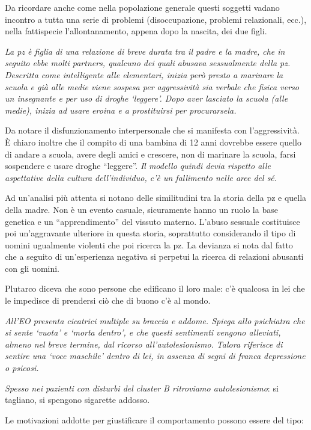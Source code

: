 \documentclass[]{article}
\begin{document}
Da ricordare anche come nella popolazione generale questi soggetti
vadano incontro a tutta una serie di problemi (disoccupazione, problemi
relazionali, ecc.), nella fattispecie l'allontanamento, appena dopo la
nascita, dei due figli.

\emph{La pz è figlia di una relazione di breve durata tra il padre e la
madre, che in seguito ebbe molti partners, qualcuno dei quali abusava
sessualmente della pz. Descritta come intelligente alle elementari,
inizia però presto a marinare la scuola e già alle medie viene sospesa
per aggressività sia verbale che fisica verso un insegnante e per uso di
droghe `leggere'. Dopo aver lasciato la scuola (alle medie), inizia ad
usare eroina e a prostituirsi per procurarsela. }

Da notare il disfunzionamento interpersonale che si manifesta con
l'aggressività. È chiaro inoltre che il compito di una bambina di 12
anni dovrebbe essere quello di andare a scuola, avere degli amici e
crescere, non di marinare la scuola, farsi sospendere e usare droghe
``leggere''. \emph{Il modello quindi devia rispetto alle aspettative
della cultura dell'individuo, c'è un fallimento nelle aree del sé.}

Ad un'analisi più attenta si notano delle similitudini tra la storia
della pz e quella della madre. Non è un evento casuale, sicuramente
hanno un ruolo la base genetica e un ``apprendimento'' del vissuto
materno. L'abuso sessuale costituisce poi un'aggravante ulteriore in
questa storia, soprattutto considerando il tipo di uomini ugualmente
violenti che poi ricerca la pz. La devianza si nota dal fatto che a
seguito di un'esperienza negativa si perpetui la ricerca di relazioni
abusanti con gli uomini.

Plutarco diceva che sono persone che edificano il loro male: c'è
qualcosa in lei che le impedisce di prendersi ciò che di buono c'è al
mondo.

\emph{All'EO presenta cicatrici multiple su braccia e addome. Spiega
allo psichiatra che si sente `vuota' e `morta dentro', e che questi
sentimenti vengono alleviati, almeno nel breve termine, dal ricorso
all'autolesionismo. Talora riferisce di sentire una `voce maschile'
dentro di lei, in assenza di segni di franca depressione o psicosi. }

\emph{Spesso nei pazienti con disturbi del cluster B ritroviamo
autolesionismo}: si tagliano, si spengono sigarette addosso.

Le motivazioni addotte per giustificare il comportamento possono essere
del tipo:
\end{document}
